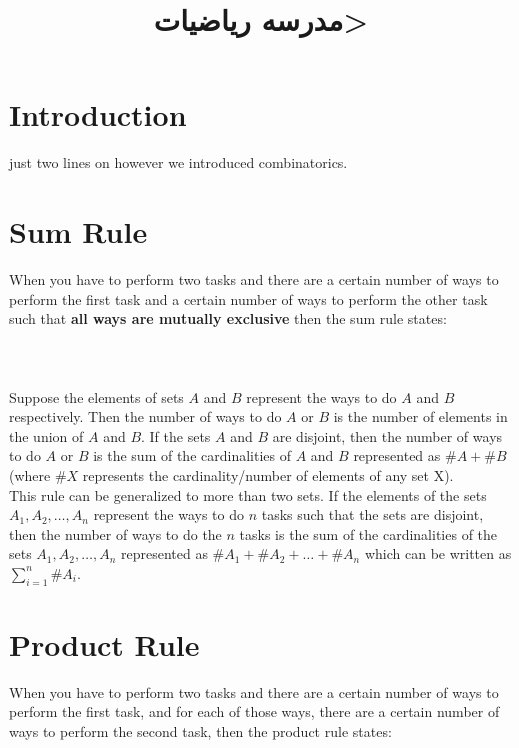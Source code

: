 \documentclass[a4paper]{exam}
\title{\<مدرسه رياضيات>}
\author{\class}
\date{\term}
\begin{document}
\maketitle

\section*{Introduction}
    just two lines on however we introduced combinatorics.

\section*{Sum Rule}
    When you have to perform two tasks and there are a certain number of ways to perform the first task and a certain number of ways to perform the other task such that \textbf{all ways are mutually exclusive} then the sum rule states:\\\\
    \noindent{}\\\\

    Suppose the elements of sets $A$ and $B$ represent the ways to do $A$ and $B$ respectively. Then the number of ways to do $A$ or $B$ is the number of elements in the union of $A$ and $B$. If the sets $A$ and $B$ are disjoint, then the number of ways to do $A$ or $B$ is the sum of the cardinalities of $A$ and $B$ represented as $\#A + \#B$ (where $\#X$ represents the cardinality/number of elements of any set X).\\
    This rule can be generalized to more than two sets. If the elements of the sets $A_1, A_2, \ldots, A_n$ represent the ways to do $n$ tasks such that the sets are disjoint, then the number of ways to do the $n$ tasks is the sum of the cardinalities of the sets $A_1, A_2, \ldots, A_n$ represented as $\#A_1 + \#A_2 + \ldots + \#A_n$ which can be written as $\sum_{i=1}^n\#A_i$.

\section*{Product Rule}
    When you have to perform two tasks and there are a certain number of ways to perform the first task, and for each of those ways, there are a certain number of ways to perform the second task, then the product rule states:\\\\
    \noindent{}\\\\
\end{document}
